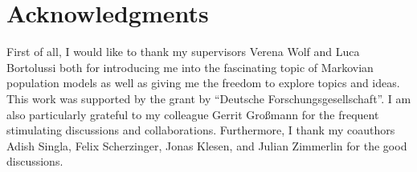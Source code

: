 



\vspace{3cm}

\begingroup
\let\clearpage\relax
\let\cleardoublepage\relax
\let\cleardoublepage\relax
\chapter*{Acknowledgments}
First of all, I would like to thank my supervisors Verena Wolf and Luca Bortolussi both for introducing me into the fascinating topic of Markovian population models as well as giving me the freedom to explore topics and ideas.
This work was supported by the  grant by ``Deutsche Forschungsgesellschaft''.
I am also particularly grateful to my colleague Gerrit Großmann for the frequent stimulating discussions and collaborations.
Furthermore, I thank my coauthors Adish Singla, Felix Scherzinger, Jonas Klesen, and Julian Zimmerlin for the good discussions.



\endgroup
